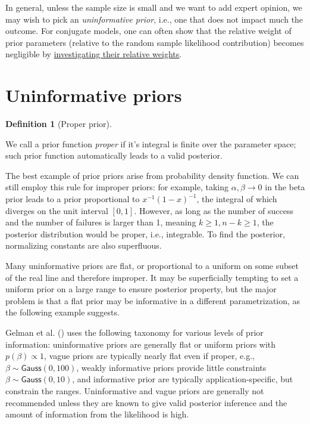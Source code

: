 \documentclass[
  11pt,
  letterpaper,
]{scrbook}
\theoremstyle{definition}
\theoremstyle{definition}
\theoremstyle{definition}
\newtheorem{definition}{Definition}[chapter]
\theoremstyle{plain}
\theoremstyle{plain}
\theoremstyle{remark}
\begin{document}
In general, unless the sample size is small and we want to add expert
opinion, we may wish to pick an \emph{uninformative prior}, i.e., one
that does not impact much the outcome. For conjugate models, one can
often show that the relative weight of prior parameters (relative to the
random sample likelihood contribution) becomes negligible by
\href{https://en.wikipedia.org/wiki/Conjugate_prior}{investigating their
relative weights}.

\section{Uninformative priors}\label{uninformative-priors}

\begin{definition}[Proper
prior]\protect\hypertarget{def-properprior}{}\label{def-properprior}

We call a prior function \emph{proper} if it's integral is finite over
the parameter space; such prior function automatically leads to a valid
posterior.

\end{definition}

The best example of prior priors arise from probability density
function. We can still employ this rule for improper priors: for
example, taking \(\alpha, \beta \to 0\) in the beta prior leads to a
prior proportional to \(x^{-1}(1-x)^{-1}\), the integral of which
diverges on the unit interval \([0,1]\). However, as long as the number
of success and the number of failures is larger than 1, meaning
\(k \geq 1, n-k \geq 1\), the posterior distribution would be proper,
i.e., integrable. To find the posterior, normalizing constants are also
superfluous.

Many uninformative priors are flat, or proportional to a uniform on some
subset of the real line and therefore improper. It may be superficially
tempting to set a uniform prior on a large range to ensure posterior
property, but the major problem is that a flat prior may be informative
in a different parametrization, as the following example suggests.

Gelman et al. () uses the following
taxonomy for various levels of prior information: uninformative priors
are generally flat or uniform priors with \(p(\beta) \propto 1\), vague
priors are typically nearly flat even if proper, e.g.,
\(\beta \sim \mathsf{Gauss}(0, 100)\), weakly informative priors provide
little constraints \(\beta \sim \mathsf{Gauss}(0, 10)\), and informative
prior are typically application-specific, but constrain the ranges.
Uninformative and vague priors are generally not recommended unless they
are known to give valid posterior inference and the amount of
information from the likelihood is high.
\end{document}
